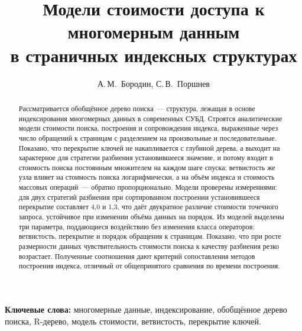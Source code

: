 \documentclass[12pt, a4paper]{article}
\title{Модели стоимости доступа к многомерным данным\\ в страничных индексных структурах}
\author{А.\,М.~Бородин, С.\,В.~Поршнев}
\date{}
\begin{document}
\maketitle

\begin{abstract}
Рассматривается обобщённое дерево поиска~--- структура, лежащая в основе
индексирования многомерных данных в современных СУБД. Строятся аналитические
модели стоимости поиска, построения и сопровождения индекса, выраженные через
число обращений к страницам с разделением на произвольные и последовательные.
Показано, что перекрытие ключей не накапливается с глубиной дерева, а выходит
на характерное для стратегии разбиения установившееся значение, и потому входит
в стоимость поиска постоянным множителем на каждом шаге спуска; ветвистость же
узла влияет на стоимость поиска логарифмически, а на объём индекса и стоимость
массовых операций~--- обратно пропорционально. Модели проверены измерениями:
для двух стратегий разбиения при сортированном построении установившееся
перекрытие составляет 4,0 и 1,3, что даёт двукратное различие стоимости
точечного запроса, устойчивое при изменении объёма данных на порядок. Из моделей выделены три параметра, поддающиеся воздействию без
изменения класса операторов: ветвистость, перекрытие и порядок обращения к
страницам. Показано, что при росте размерности данных чувствительность
стоимости поиска к качеству разбиения резко возрастает. Полученные соотношения
дают критерий сопоставления методов построения индекса, отличный от
общепринятого сравнения по времени построения.
\end{abstract}

\textbf{Ключевые слова:} многомерные данные, индексирование, обобщённое дерево
поиска, R-дерево, модель стоимости, ветвистость, перекрытие ключей.





\end{document}
